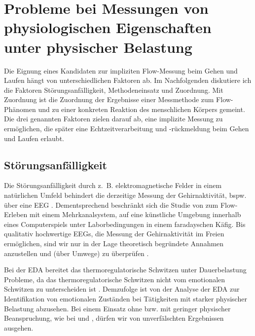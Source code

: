 
\section{Probleme bei Messungen von physiologischen Eigenschaften unter physischer Belastung} %
\label{sec:probleme_bei_messungen}

Die Eignung eines Kandidaten zur impliziten Flow-Messung beim Gehen und Laufen hängt von unterschiedlichen Faktoren ab. Im Nachfolgenden diskutiere ich die Faktoren Störungsanfälligkeit, Methodeneinsatz und Zuordnung. Mit Zuordnung ist die Zuordnung der Ergebnisse einer Messmethode zum Flow-Phänomen und zu einer konkreten Reaktion des menschlichen Körpers gemeint. Die drei genannten Faktoren zielen darauf ab, eine implizite Messung zu ermöglichen, die später eine Echtzeitverarbeitung und -rückmeldung beim Gehen und Laufen erlaubt.

\subsection{Störungsanfälligkeit} %
\label{sub:storungsanfalligkeit}

Die Störungsanfälligkeit durch z.~B. elektromagnetische Felder in einem natürlichen Umfeld behindert die derzeitige Messung der Gehirnaktivität, bspw. über eine \ac{EEG} \citep[][S.~56]{Henk2014}. Dementsprechend beschränkt sich die Studie von \citet{Hugentobler2011} zum Flow-Erleben mit einem Mehrkanalsystem, auf eine künstliche Umgebung innerhalb eines Computerspiels unter Laborbedingungen in einem faradayschen Käfig. Bis qualitativ hochwertige \acp{EEG}, die Messung der Gehirnaktivität im Freien ermöglichen, sind wir nur in der Lage theoretisch begründete Annahmen anzustellen und (über Umwege) zu überprüfen \citep[][S.~56]{Henk2014}.


Bei der EDA bereitet das thermoregulatorische Schwitzen unter Dauerbelastung Probleme, da das thermoregulatorische Schwitzen nicht vom emotionalen Schwitzen zu unterscheiden ist \citep[][]{Baumeister2009}. Demzufolge ist von der Analyse der \ac{EDA} zur Identifikation von emotionalen Zuständen bei Tätigkeiten mit starker physischer Belastung abzusehen. Bei einem Einsatz ohne bzw. mit geringer physischer Beanspruchung, wie bei \citet{Kivikangas2006} und \citet{Nacke2008}, dürfen wir von unverfälschten Ergebnissen ausgehen.

